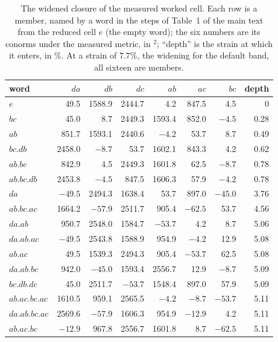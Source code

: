 \documentclass[preprint,pdf]{iucr}          %
\newcommand{\Ang}{\text{\AA}}
\begin{document}
\begin{table}
\caption{The widened closure of the measured worked cell. Each row is a member, named by a word in the steps of Table~1 of the main text from the reduced cell $e$ (the empty word); the six numbers are its conorms under the measured metric, in \Ang$^2$; ``depth'' is the strain at which it enters, in \%. At a strain of $7.7\%$, the widening for the default band, all sixteen are members.}
\label{tab:filter}
\begin{footnotesize}
\begin{tabular}{lrrrrrrr}
\toprule
word & $da$ & $db$ & $dc$ & $ab$ & $ac$ & $bc$ & depth \\
\midrule
$e$ & 49.5 & 1588.9 & 2444.7 & 4.2 & 847.5 & 4.5 & 0 \\
$bc$ & 45.0 & 8.7 & 2449.3 & 1593.4 & 852.0 & $-4.5$ & 0.28 \\
$ab$ & 851.7 & 1593.1 & 2440.6 & $-4.2$ & 53.7 & 8.7 & 0.49 \\
$bc.db$ & 2458.0 & $-8.7$ & 53.7 & 1602.1 & 843.3 & 4.2 & 0.62 \\
$ab.bc$ & 842.9 & 4.5 & 2449.3 & 1601.8 & 62.5 & $-8.7$ & 0.78 \\
$ab.bc.db$ & 2453.8 & $-4.5$ & 847.5 & 1606.3 & 57.9 & $-4.2$ & 0.78 \\
\midrule
$da$ & $-49.5$ & 2494.3 & 1638.4 & 53.7 & 897.0 & $-45.0$ & 3.76 \\
$ab.bc.ac$ & 1664.2 & $-57.9$ & 2511.7 & 905.4 & $-62.5$ & 53.7 & 4.56 \\
$da.ab$ & 950.7 & 2548.0 & 1584.7 & $-53.7$ & 4.2 & 8.7 & 5.06 \\
$da.ab.ac$ & $-49.5$ & 2543.8 & 1588.9 & 954.9 & $-4.2$ & 12.9 & 5.08 \\
$ab.ac$ & 49.5 & 1539.3 & 2494.3 & 905.4 & $-53.7$ & 62.5 & 5.08 \\
$da.ab.bc$ & 942.0 & $-45.0$ & 1593.4 & 2556.7 & 12.9 & $-8.7$ & 5.09 \\
$bc.db.dc$ & 45.0 & 2511.7 & $-53.7$ & 1548.4 & 897.0 & 57.9 & 5.09 \\
$ab.ac.bc.ac$ & 1610.5 & 959.1 & 2565.5 & $-4.2$ & $-8.7$ & $-53.7$ & 5.11 \\
$da.ab.bc.ac$ & 2569.6 & $-57.9$ & 1606.3 & 954.9 & $-12.9$ & 4.2 & 5.11 \\
$ab.ac.bc$ & $-12.9$ & 967.8 & 2556.7 & 1601.8 & 8.7 & $-62.5$ & 5.11 \\
\bottomrule
\end{tabular}
\end{footnotesize}
\end{table}
\end{document}
